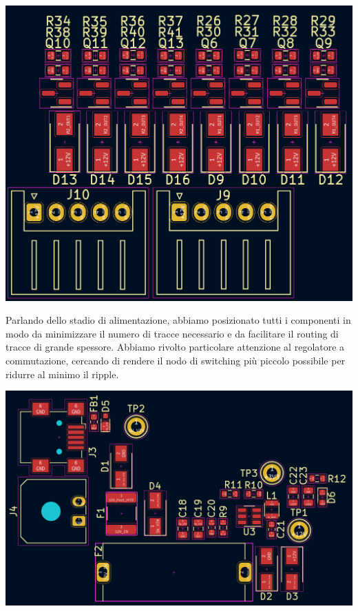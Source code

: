 \begin{center}
\includegraphics[scale=0.3]{figures/image55.png}
\captionsetup{type=figure}
\end{center}

\noindent Parlando dello stadio di alimentazione, abbiamo posizionato tutti i
componenti in modo da minimizzare il numero di tracce necessario e da
facilitare il routing di tracce di grande spessore. Abbiamo rivolto
particolare attenzione al regolatore a commutazione, cercando di rendere
il nodo di switching più piccolo possibile per ridurre al minimo il
ripple.

\begin{center}
\includegraphics[scale=0.25]{figures/image56.png}
\captionsetup{type=figure}
\end{center}

